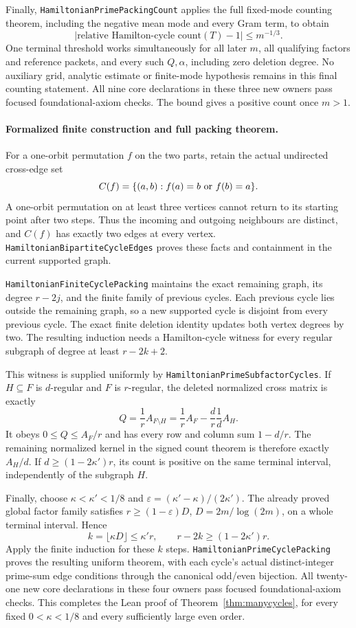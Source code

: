 Finally, \texttt{HamiltonianPrimePackingCount} applies
the full fixed-mode counting theorem, including the
negative mean mode and every Gram term, to obtain
\[
 \left|\text{relative Hamilton-cycle count}(T)-1\right|
                                                    \leq m^{-1/3}.
\]
One terminal threshold works simultaneously for all
later \(m\), all qualifying factors and reference
packets, and every such \(Q,\alpha\), including zero
deletion degree. No auxiliary grid, analytic estimate
or finite-mode hypothesis remains in this final
counting statement.
All nine core declarations in these three new owners
pass focused foundational-axiom checks.
The bound gives a positive count once \(m>1\).
\paragraph{Formalized finite construction and full packing theorem.}
For a one-orbit permutation \(f\) on the two parts, retain the
actual undirected cross-edge set
\[
 C(f)=\{(a,b):f(a)=b\ \hbox{or}\ f(b)=a\}.
\]
A one-orbit permutation on at least three vertices cannot
return to its starting point after two steps. Thus the incoming
and outgoing neighbours are distinct, and \(C(f)\) has exactly
two edges at every vertex.
\texttt{HamiltonianBipartiteCycleEdges} proves these facts and
containment in the current supported graph.

\texttt{HamiltonianFiniteCyclePacking} maintains the exact
remaining graph, its degree \(r-2j\), and the finite family of
previous cycles. Each previous cycle lies outside the
remaining graph, so a new supported cycle is disjoint from
every previous cycle. The exact finite deletion identity
updates both vertex degrees by two. The resulting induction
needs a Hamilton-cycle witness for every regular subgraph
of degree at least \(r-2k+2\).

This witness is supplied uniformly by
\texttt{HamiltonianPrimeSubfactorCycles}.
If \(H\subseteq F\) is \(d\)-regular and \(F\) is \(r\)-regular,
the deleted normalized cross matrix is exactly
\[
 Q=\frac1r A_{F\setminus H}
   =\frac1r A_F-\frac dr\frac1d A_H.
\]
It obeys \(0\leq Q\leq A_F/r\) and has every row and column
sum \(1-d/r\). The remaining normalized kernel in the signed
count theorem is therefore exactly \(A_H/d\). If
\(d\geq(1-2\kappa')r\), its count is positive on the same
terminal interval, independently of the subgraph \(H\).

Finally, choose \(\kappa<\kappa'<1/8\) and
\(\varepsilon=(\kappa'-\kappa)/(2\kappa')\).
The already proved global factor family satisfies
\(r\geq(1-\varepsilon)D\), \(D=2m/\log(2m)\), on a whole
terminal interval. Hence
\[
 k=\lfloor\kappa D\rfloor\leq\kappa'r,\qquad
 r-2k\geq(1-2\kappa')r.
\]
Apply the finite induction for these \(k\) steps.
\texttt{HamiltonianPrimeCyclePacking} proves the resulting
uniform theorem, with each cycle's actual distinct-integer
prime-sum edge conditions through the canonical odd/even
bijection. All twenty-one new core declarations in these
four owners pass focused foundational-axiom checks.
This completes the Lean proof of
Theorem~\ref{thm:manycycles}, for every fixed
\(0<\kappa<1/8\) and every sufficiently large even order.

